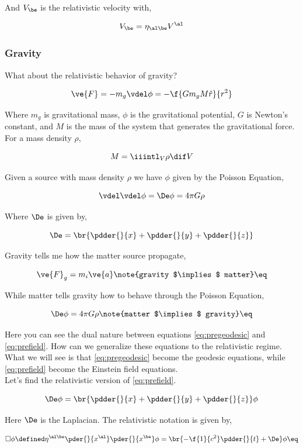 \documentclass{article}
\begin{document}
And $V_\be$ is the relativistic velocity with,

\[  V_\be = \eta_{\al\be}V^\al \]

\subsubsection{Gravity}

What about the relativistic behavior of gravity?

\[ \ve{F} = - m_g \vdel \phi  = - \f{Gm_g M \hat{r}}{r^2}\]

Where $m_g$ is gravitational mass, $\phi$ is the gravitational potential, $G$ is Newton's constant, and $M$ is the mass of the system that generates the gravitational force. For a mass density $\rho$,

\[ M = \iiintl_{V} \rho \dif V \]

Given a source with mass density $\rho$ we have $\phi$ given by the Poisson Equation,

\[ \vdel \vdel \phi = \De \phi = 4\pi G\rho \]

Where $\De$ is given by,

\[ \De = \br{\pdder{}{x} + \pdder{}{y} + \pdder{}{z}} \]

Gravity tells me how the matter source propagate,

\[ \ve{F}_g  = m_i \ve{a} \note{gravity $\implies$ matter} \eq \label{eq:pregeodesic}\]

While matter tells gravity how to behave through the Poisson Equation,

\[ \De \phi = 4\pi G \rho \note{matter $\implies$ gravity} \eq \label{eq:prefield}\]

Here you can see the dual nature between equations \eqref{eq:pregeodesic} and \eqref{eq:prefield}. How can we generalize these equations to the relativistic regime. What we will see is that \eqref{eq:pregeodesic} become the geodesic equations, while \eqref{eq:prefield} become the Einstein field equations. \\

Let's find the relativistic version of \eqref{eq:prefield}.

\[ \De \phi = \br{\pdder{}{x} + \pdder{}{y} + \pdder{}{z} } \phi \]

Here $\De$ is the Laplacian. The relativistic notation is given by,

\[ \Box \phi \defined \eta^{\al\be} \pder{}{x^\al} \pder{}{x^\be} \phi = \br{-\f{1}{c^2}\pdder{}{t} + \De} \phi \eq \label{eq:alembert}\]
\end{document}
